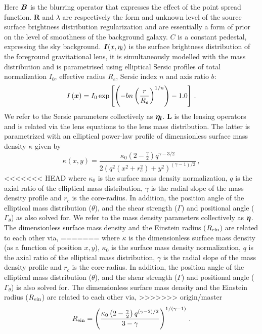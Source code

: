 \documentclass[a4paper,fleqn,usenatbib]{mnras}
\begin{document}
%
Here $\bmath B$ is the blurring operator that expresses the effect of the point spread function. $\mathbf{R}$ and $\lambda$ are respectively the form and unknown level of the source surface brightness distribution regularization and are essentially a form of prior on the level of smoothness of the background galaxy. $C$ is a constant pedestal, expressing the sky background. $\bmath I({x,\eta_l})$ is the surface brightness distribution of the foreground gravitational lens, it is simultaneously modelled with the mass distribution and is parametrised using elliptical Sersic profiles of total normalization $I_0$, effective radius $R_{e}$,  Sersic index $n$ and axis ratio $b$:
%
\begin{equation}
I \left (\bmath{x}\right ) = I_0 \exp \left [  \left (  - bn  \left (  \frac{r}{R_e} \right ) ^ {1/n} \right )  - 1.0   \right ]\,.
\end{equation}
%
We refer to the Sersic parameters collectively as $\bmath{\eta_l}$. $\mathbf{L}$ is the lensing operators and is related via the lens equations to the lens mass distribution.
The latter is parametrized with an elliptical power-law profile of dimensionless surface mass density $\kappa$ given by
%
\begin{equation}\label{massdensity}
\kappa\left (x,y \right ) = \frac{\kappa_0 \left ( 2 - \frac{\gamma}{2} \right ) q^{\gamma - 3/2}}{2 \left ( q^2 \left ( x^2 + r_c^2 \right ) + y^2\right )^{\left ( \gamma - 1 \right )/2}}\,, 
\end{equation}
<<<<<<< HEAD
%
where $\kappa_0$ is the surface mass density normalization, $q$ is the axial ratio of the elliptical mass distribution, $\gamma$ is the radial slope of the mass density profile and $r_c$ is the core-radius. In addition, the position angle of the elliptical mass distribution ($\theta$), and the shear strength ($\Gamma$) and positional angle ($\Gamma_\theta$) as also solved for.
We refer to the mass density parameters collectively as $\bmath{\eta}$. The dimensionless surface mass density and the Einstein radius ($R_{\rm{ein}}$) are related to each other via,
%
=======
where $\kappa$ is the dimensionless surface mass density (as a function of position $x,y$), $\kappa_0$ is the surface mass density normalization, $q$ is the axial ratio of the elliptical mass distribution, $\gamma$ is the radial slope of the mass density profile and $r_c$ is the core-radius. In addition, the position angle of the elliptical mass distribution ($\theta$), and the shear strength ($\Gamma$) and positional angle ($\Gamma_\theta$) is also solved for. The dimensionless surface mass density and the Einstein radius ($R_{\rm{ein}}$) are related to each other via,
>>>>>>> origin/master
\begin{equation}\label{einsteinradius}
R_{\rm{ein}} = \left ( \frac{\kappa_0 \left ( 2 - \frac{\gamma}{2} \right ) q^{\left ( \gamma - 2 \right )/2}}{3 - \gamma} \right )^{1/\left ( \gamma - 1 \right )}\,.
\end{equation}
%
\end{document}
